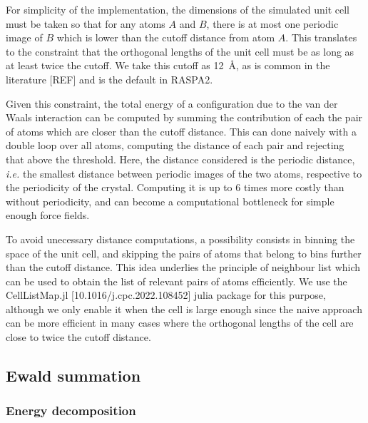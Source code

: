 \documentclass[main.tex]{subfiles}
\begin{document}
For simplicity of the implementation, the dimensions of the simulated unit cell must be taken so that for any atoms $A$ and $B$, there is at most one periodic image of $B$ which is lower than the cutoff distance from atom $A$. This translates to the constraint that the orthogonal lengths of the unit cell must be as long as at least twice the cutoff. We take this cutoff as \qty{12}{\angstrom}, as is common in the literature [REF] and is the default in RASPA2.

Given this constraint, the total energy of a configuration due to the van der Waals interaction can be computed by summing the contribution of each the pair of atoms which are closer than the cutoff distance. This can done naively with a double loop over all atoms, computing the distance of each pair and rejecting that above the threshold. Here, the distance considered is the periodic distance, \textit{i.e.} the smallest distance between periodic images of the two atoms, respective to the periodicity of the crystal. Computing it is up to 6 times more costly than without periodicity, and can become a computational bottleneck for simple enough force fields.

To avoid unecessary distance computations, a possibility consists in binning the space of the unit cell, and skipping the pairs of atoms that belong to bins further than the cutoff distance. This idea underlies the principle of neighbour list which can be used to obtain the list of relevant pairs of atoms efficiently. We use the CellListMap.jl [10.1016/j.cpc.2022.108452] julia package for this purpose, although we only enable it when the cell is large enough since the naive approach can be more efficient in many cases where the orthogonal lengths of the cell are close to twice the cutoff distance.

\subsection{Ewald summation}

\subsubsection{Energy decomposition}
\end{document}
